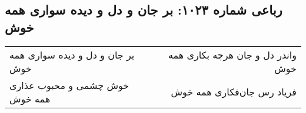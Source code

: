 \begin{center}
\section*{رباعی شماره ۱۰۲۳: بر جان و دل و دیده سواری همه خوش}
\label{sec:1023}
\begin{longtable}{l p{0.5cm} r}
بر جان و دل و دیده سواری همه خوش
&&
واندر دل و جان هرچه بکاری همه خوش
\\
خوش چشمی و محبوب عذاری همه خوش
&&
فریاد رس جان‌فکاری همه خوش
\\
\end{longtable}
\end{center}
